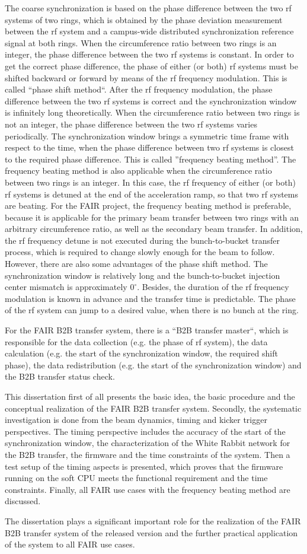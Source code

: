 The coarse synchronization is based on the phase difference between the two rf systems of two rings, which is obtained by the phase deviation measurement between the rf system and a campus-wide distributed synchronization reference signal at both rings. When the circumference ratio between two rings is an integer, the phase difference between the two rf systems is constant. In order to get the correct phase difference, the phase of either (or both) rf systems must be shifted backward or forward by means of the rf frequency modulation. This is called “phase shift method“. After the rf frequency modulation, the phase difference between the two rf systems is correct and the synchronization window is infinitely long theoretically. When the circumference ratio between two rings is not an integer, the phase difference between the two rf systems varies periodically. The synchronization window brings a symmetric
time frame with respect to the time, when the phase difference between two rf systems is closest to the required phase difference. This is called ”frequency beating method”. The frequency beating method is also applicable when the circumference ratio between two rings is an integer. In this case, the rf frequency of either (or both) rf systems is detuned at the end of the acceleration ramp, so that two rf systems are beating. For the FAIR project, the frequency beating method is preferable, because it is applicable for the primary beam transfer between two rings with an arbitrary circumference ratio, as well as the secondary beam transfer. In addition, the rf frequency detune is not executed during the bunch-to-bucket transfer process, which is required to change slowly enough for the beam to follow. However, there are also some advantages of the phase shift method. The synchronization window is relatively long and the bunch-to-bucket injection center mismatch is approximately $0^\circ$. Besides, the duration of the rf frequency modulation is known in advance and the transfer time is predictable. The phase of the rf system can jump to a desired value, when there is no bunch at the ring.  

For the FAIR B2B transfer system, there is a “B2B transfer master“, which is responsible for the data collection (e.g. the phase of rf system), the data calculation (e.g. the start of the synchronization window, the required shift phase), the data redistribution (e.g. the start of the synchronization window) and the B2B transfer status check.

 
This dissertation first of all presents the basic idea, the basic procedure and the conceptual realization of the FAIR B2B transfer system. Secondly, the systematic investigation is done from the beam dynamics, timing and kicker trigger perspectives. The timing perspective includes the accuracy of the start of the synchronization window, the characterization of the White Rabbit network for the B2B transfer, the firmware and the time constraints of the system. Then a test setup of the timing aspects is presented, which proves that the firmware running on the soft CPU meets the functional requirement and the time constraints. Finally, all FAIR use cases with the frequency beating method are discussed.

The dissertation plays a significant important role for the realization of the FAIR B2B transfer system of the released version and the further practical application of the system to all FAIR use cases.  




